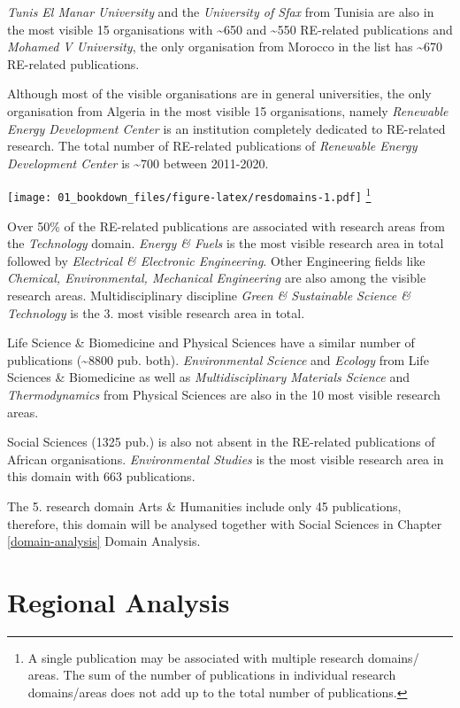 \documentclass[
]{book}
\begin{document}
\emph{Tunis El Manar University} and the \emph{University of Sfax} from Tunisia are also in the most visible 15 organisations with \textasciitilde650 and \textasciitilde550 RE-related publications and \emph{Mohamed V University}, the only organisation from Morocco in the list has \textasciitilde670 RE-related publications.

Although most of the visible organisations are in general universities, the only organisation from Algeria in the most visible 15 organisations, namely \emph{Renewable Energy Development Center} is an institution completely dedicated to RE-related research. The total number of RE-related publications of \emph{Renewable Energy Development Center} is \textasciitilde700 between 2011-2020.

\texttt{[image: 01\_bookdown\_files/figure-latex/resdomains-1.pdf]}
\footnote{A single publication may be associated with multiple research domains/ areas. The sum of the number of publications in individual research domains/areas does not add up to the total number of publications.}

Over 50\% of the RE-related publications are associated with research areas from the \emph{Technology} domain. \emph{Energy \& Fuels} is the most visible research area in total followed by \emph{Electrical \& Electronic Engineering}. Other Engineering fields like \emph{Chemical, Environmental, Mechanical Engineering} are also among the visible research areas. Multidisciplinary discipline \emph{Green \& Sustainable Science \& Technology} is the 3. most visible research area in total.

Life Science \& Biomedicine and Physical Sciences have a similar number of publications (\textasciitilde8800 pub. both). \emph{Environmental Science} and \emph{Ecology} from Life Sciences \& Biomedicine as well as \emph{Multidisciplinary Materials Science} and \emph{Thermodynamics} from Physical Sciences are also in the 10 most visible research areas.

Social Sciences (1325 pub.) is also not absent in the RE-related publications of African organisations. \emph{Environmental Studies} is the most visible research area in this domain with 663 publications.

The 5. research domain Arts \& Humanities include only 45 publications, therefore, this domain will be analysed together with Social Sciences in Chapter \ref{domain-analysis} Domain Analysis.

\hypertarget{regional-analysis}{%
\section{Regional Analysis}\label{regional-analysis}}
\end{document}
